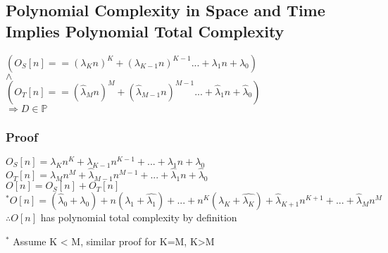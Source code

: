 \documentclass[11pt]{article}
\begin{document}
\subsection{Polynomial Complexity in Space and Time Implies Polynomial Total Complexity}
\begin{center}
\vspace{1mm}
$
(O_S[n] == (\lambda_K n)^K + (\lambda_{K-1} n)^{K-1}... + \lambda_1 n + \lambda_0)
$
\\ \vspace{2mm}
$
\land
$
\\ \vspace{2mm}
$
(O_T[n] == (\hat{\lambda}_M n)^M + (\hat{\lambda}_{M-1} n)^{M-1}... + \hat{\lambda}_1 n + \hat{\lambda}_0)
$
\\ \vspace{4mm}
$
\Rightarrow D \in \mathbb{P}
$
\end{center}

\subsubsection{Proof}
\begin{center}
\vspace{1mm}
$
O_S[n] = \lambda_K n^K + \lambda_{K-1} n^{K-1} + ... + \lambda_1 n + \lambda_0
$
\\ \vspace{3mm}
$
O_T[n] = \hat{\lambda}_M n^M + \hat{\lambda}_{M-1} n^{M-1} + ... + \hat{\lambda}_1 n + \hat{\lambda}_0
$
\\ \vspace{3mm}
$
O[n] = O_S[n] + O_T[n]
$
\\ \vspace{3mm}
$
^*O[n] = (\hat{\lambda}_0 + \lambda_0) + n(\lambda_1 + \hat{\lambda_1}) + ... + n^K(\lambda_K + \hat{\lambda_K}) + \hat{\lambda}_{K+1}n^{K+1} + ... +  \hat{\lambda}_M n^M
$
\\ \vspace{3mm}
$
\therefore O[n]$ has polynomial total complexity by definition
\end{center}
$^*$ Assume K < M, similar proof for K=M, K>M











\end{document}
